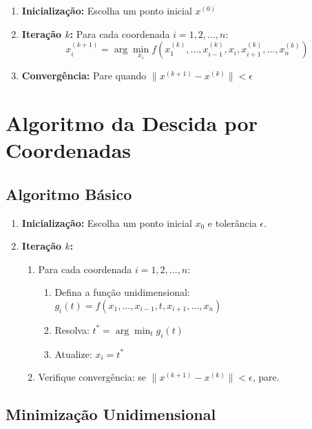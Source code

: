 \documentclass[12pt]{article}
\begin{document}
\begin{enumerate}
    \item \textbf{Inicialização:} Escolha um ponto inicial $x^{(0)}$
    \item \textbf{Iteração $k$:} Para cada coordenada $i = 1, 2, \ldots, n$:
    \begin{equation}
    x_i^{(k+1)} = \arg\min_{x_i} f(x_1^{(k)}, \ldots, x_{i-1}^{(k)}, x_i, x_{i+1}^{(k)}, \ldots, x_n^{(k)})
    \end{equation}
    \item \textbf{Convergência:} Pare quando $\|x^{(k+1)} - x^{(k)}\| < \epsilon$
\end{enumerate}

\section{Algoritmo da Descida por Coordenadas}

\subsection{Algoritmo Básico}

\begin{enumerate}[label=\textbf{Passo \arabic*:}]
    \item \textbf{Inicialização:} Escolha um ponto inicial $x_0$ e tolerância $\epsilon$.
    
    \item \textbf{Iteração $k$:}
    \begin{enumerate}[label=(\alph*)]
        \item Para cada coordenada $i = 1, 2, \ldots, n$:
        \begin{enumerate}[label=\roman*]
            \item Defina a função unidimensional: $g_i(t) = f(x_1, \ldots, x_{i-1}, t, x_{i+1}, \ldots, x_n)$
            \item Resolva: $t^* = \arg\min_t g_i(t)$
            \item Atualize: $x_i = t^*$
        \end{enumerate}
        \item Verifique convergência: se $\|x^{(k+1)} - x^{(k)}\| < \epsilon$, pare.
    \end{enumerate}
\end{enumerate}

\subsection{Minimização Unidimensional}
\end{document}
